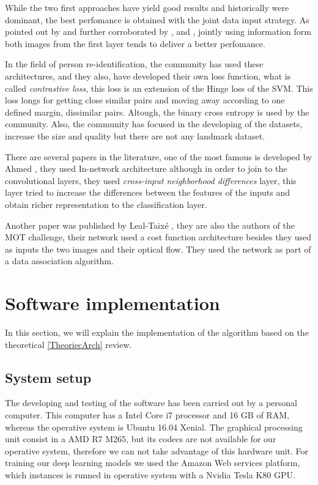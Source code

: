 \documentclass[12pt, a4paper, titlepage,twoside,openright]{article}
\begin{document}
While the two first approaches have yield good results and historically were dominant, the best perfomance is obtained with the joint data input strategy. As pointed out by  \cite{patch1} and further corroborated by \cite{patch2}, and \cite{patch3}, jointly using information form both images from the first layer tends to deliver a better perfomance. 


In the field of person re-identification, the community has used these architectures, and they also, have developed their own loss function, what is called \textit{contrastive loss}, this loss is an extension of the Hinge loss of the SVM. This loss longs for getting close similar pairs and moving away according to one defined margin, dissimilar pairs. Altough, the binary cross entropy is used by the community. Also, the community has focused in the developing of the datasets, increase the size and quality but there are not any landmark dataset.


There are several papers in the literature, one of the most famous is developed by Ahmed \cite{ahmed}, they used In-network architecture although in order to join to the convolutional layers, they used \textit{cross-input neighborhood differences} layer, this layer tried to increase the differences between the features of the inputs and obtain richer representation to the classification layer.

Another paper was published by Leal-Taixé \cite{lealTaixe}, they are also the authors of the MOT challenge, their network used a cost function architecture besides they used as inputs the two images and their optical flow. They used the network as part of a data association algorithm.


\section{Software implementation}

In this section, we will explain the implementation of the algorithm based on the theoretical \ref{TheoriecArch} review.

\subsection{System setup}

The developing and testing of the software has been carried out by a personal computer. This computer has a Intel Core i7 processor and 16 GB of RAM, whereas the operative system is Ubuntu 16.04 Xenial. The graphical processing unit consist in a AMD R7 M265, but its codecs are not available for our operative system, therefore we can not take advantage of this hardware unit. For training our deep learning models we used the Amazon Web services platform, which instances is runned in operative system with a Nvidia Tesla K80 GPU. 
\end{document}
